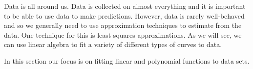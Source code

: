  \label{sec:least_squares}

\vspace*{-17 pt}

\vspace*{13 pt}


Data is all around us. Data is collected on almost everything and it is important to be able to use data to make predictions. However, data is rarely well-behaved and so we generally need to use approximation techniques to estimate from the data. One technique for this is least squares approximations. As we will see, we can use linear algebra to fit a variety of different types of curves to data. 



In this section our focus is on fitting linear and polynomial functions to data sets. 


